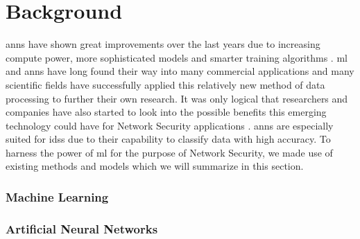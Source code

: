 \chapter{Background} \label{sec:background}

\glspl{ann} have shown great improvements over the last years due to increasing compute power, more sophisticated models and smarter training algorithms . \gls{ml} and \glspl{ann} have long found their way into many commercial applications and many scientific fields have successfully applied this relatively new method of data processing to further their own research.  It was only logical that researchers and companies have also started to look into the possible benefits this emerging technology could have for Network Security applications . \glspl{ann} are especially suited for \glspl{ids} due to their capability to classify data with high accuracy. To harness the power of \gls{ml} for the purpose of Network Security, we made use of existing methods and models which we will summarize in this section.

\subsection{Machine Learning} \label{sec:background:ml}

\subsection{Artificial Neural Networks} \label{sec:background:ann}

